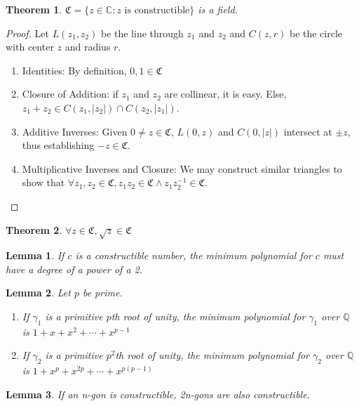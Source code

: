 \documentclass{article}
\theoremstyle{definition}
\theoremstyle{plain}
\newtheorem{theorem}{Theorem}
\theoremstyle{corollary}
\theoremstyle{lemma}
\newtheorem{lemma}{Lemma}
\begin{document}
\begin{theorem}
    $\mathfrak C=\{z\in\mathbb{C}:z\text{ is constructible}\}$ is a field.
\end{theorem}

\begin{proof}
Let $L(z_1,z_2)$ be the line through $z_1$ and $z_2$ and $C(z,r)$ be the circle with center $z$ and radius $r$.
    \begin{enumerate}
        \item Identities: By definition, $0,1\in\mathfrak{C}$
        \item Closure of Addition: if $z_1$ and $z_2$ are collinear, it is easy. Else, $z_1+z_2\in C(z_1,|z_2|)\cap C(z_2,|z_1|)$.
        \item Additive Inverses: Given $0\neq z\in\mathfrak C$, $L(0,z)$ and $C(0,|z|)$ intersect at $\pm z$, thus establishing $-z\in\mathfrak C$.
        \item Multiplicative Inverses and Closure: We may construct similar triangles to show that $\forall z_1,z_2\in\mathfrak{C},z_1z_2\in\mathfrak C\land z_1z_2^{-1}\in\mathfrak{C}$.
    \end{enumerate}
\end{proof}

\begin{theorem}
    $\forall z\in\mathfrak{C},\sqrt z\in\mathfrak C$
\end{theorem}

\begin{lemma}
    If $c$ is a constructible number, the minimum polynomial for $c$ must have a degree of a power of a 2.
\end{lemma}

\begin{lemma}
Let $p$ be prime.
    \begin{enumerate}
        \item If $\gamma_1$ is a primitive $p$th root of unity, the minimum polynomial for $\gamma_1$ over $\mathbb{Q}$ is $1+x+x^2+\cdots+x^{p-1}$
        \item If $\gamma_2$ is a primitive $p^2$th root of unity, the minimum polynomial for $\gamma_2$ over $\mathbb{Q}$ is $1+x^p+x^{2p}+\cdots+x^{p(p-1)}$
    \end{enumerate}
\end{lemma}

\begin{lemma}
    If an n-gon is constructible, 2n-gons are also constructible.
\end{lemma}
\end{document}
